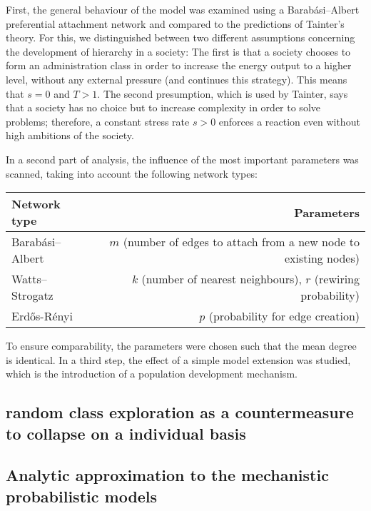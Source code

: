 First, the general behaviour of the model was examined using a Barabási–Albert preferential attachment network and compared to the predictions of Tainter's theory. For this, we distinguished between two different assumptions concerning the development of hierarchy in a society: The first is that a society chooses to form an administration class in order to increase the energy output to a higher level, without any external pressure (and continues this strategy). This means that $s = 0$ and $T>1$. The second presumption, which is used by Tainter, says that a society has no choice but to increase complexity in order to solve problems; therefore, a constant stress rate $s > 0$ enforces a reaction even without high ambitions of the society.

In a second part of analysis, the influence of the most important parameters was scanned, taking into account the following network types:

\begin{table}[h!]
\centering
\begin{tabular}{l|r}
Network type & Parameters \\\hline
Barabási–Albert & $m$ (number of edges to attach from a new node to existing nodes) \\
Watts–Strogatz & $k$ (number of nearest neighbours), $r$ (rewiring probability) \\
Erdős-Rényi & $p$ (probability for edge creation)
\end{tabular}
\end{table}

To ensure comparability, the parameters were chosen such that the mean degree is identical.
In a third step, the effect of a simple model extension was studied, which is the introduction of a population development mechanism.

\subsection{random class exploration as a countermeasure to collapse on a individual basis}


\subsection{Analytic approximation to the mechanistic probabilistic models}
